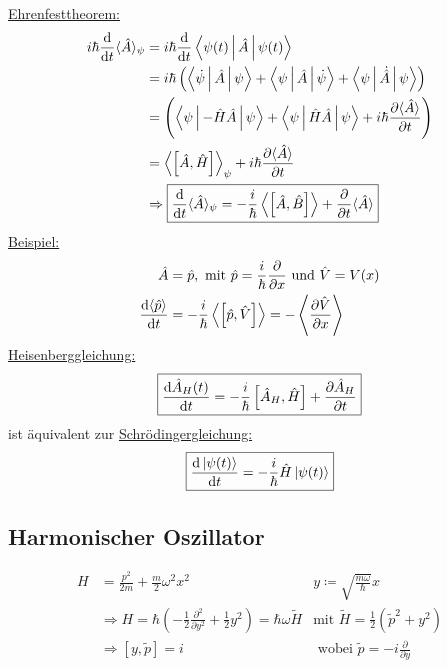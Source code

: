 	\underline{Ehrenfesttheorem:}
		\begin{align*}
			i \hbar \frac{\mathrm{d}}{\mathrm{d} t} \langle \hat{A} \rangle_\psi
			&= i \hbar \frac{\mathrm{d}}{\mathrm{d} t} \Braket{\psi(t) | \hat{A} | \psi(t)} \\ 
			&= i \hbar \left( \Braket{\dot{\psi} | \hat{A} | \psi} + \Braket{\psi | \hat{A} | \dot{\psi}} + \Braket{\psi | \dot{\hat{A}} | \psi} \right) \\ 
			&= \left( \Braket{\psi | - \hat{H} \hat{A} | \psi} + \Braket{\psi | \hat{H} \hat{A} | \psi} + i\hbar \frac{\partial \langle {\hat{A}} \rangle}{\partial t} 
			\right) \\ 
			&= \left\langle {\left[\hat{A} , \hat{H} \right]} \right\rangle_\psi + i\hbar \frac{\partial \langle {\hat{A}} \rangle}{\partial t} 		\\
			&\Rightarrow \boxed{\frac{\mathrm{d}}{\mathrm{d} t} \langle {\hat{A}} \rangle_\psi = -\frac{i}{\hbar} \left\langle {\left[ \hat{A} , \hat{B} \right]} \right\rangle + \frac{\partial}{\partial t} \langle {\hat{A}} \rangle}	
		\end{align*} %
	\underline{Beispiel:}
		\begin{align*}
			\hat{A} &= \hat{p} , \text{~mit~} \hat{p} = \frac{i}{\hbar} \frac{\partial}{\partial x} \text{~und~}
			\hat{V} = V(x) \\
			\frac{\mathrm{d} \langle {\hat{p}} \rangle}{\mathrm{d} t} &=
			- \frac{i}{\hbar} \left\langle {\left[ \hat{p}, \hat{V}\right]} \right\rangle = - \left\langle {\frac{\partial \hat{V}}{\partial x}} \right\rangle 
		\end{align*}
	\underline{Heisenberggleichung:}
		\begin{align*}
			\boxed{\frac{\mathrm{d} \hat{A}_H(t)}{\mathrm{d} t}
					= - \frac{i}{\hbar} \left[ \hat{A}_H , \hat{H}\right]
					+ \frac{\partial \hat{A}_H}{\partial t}	}
		\end{align*}
	ist äquivalent zur \underline{Schrödingergleichung:}
		\begin{equation*}
			\boxed{\frac{\mathrm{d} \ket{\psi(t)}}{\mathrm{d} t} =
					- \frac{i}{\hbar} \hat{H} \ket{\psi(t)}
					}
		\end{equation*}
	\subsection{Harmonischer Oszillator}
		\begin{align*}
			H &= \frac{p^2}{2m} + \frac{m}{2} \omega^2 x^2 
			&y\coloneqq \sqrt{\frac{m \omega}{\hbar}} x \\
			&\Rightarrow H 
			= \hbar \left(- \frac{1}{2} \frac{\partial^2}{\partial y^2} 
			+ \frac{1}{2} y^2\right)
			= \hbar \omega \tilde{H} 
			&\text{mit~} \tilde{H} = \frac{1}{2} \left(\tilde{p}^2 + y^2\right)\\
			&\Rightarrow \left[ y, \tilde{p}\right] = i 
			&\text{~wobei~} \tilde{p} =-i \frac{\partial}{\partial y} \\
		\end{align*} %

